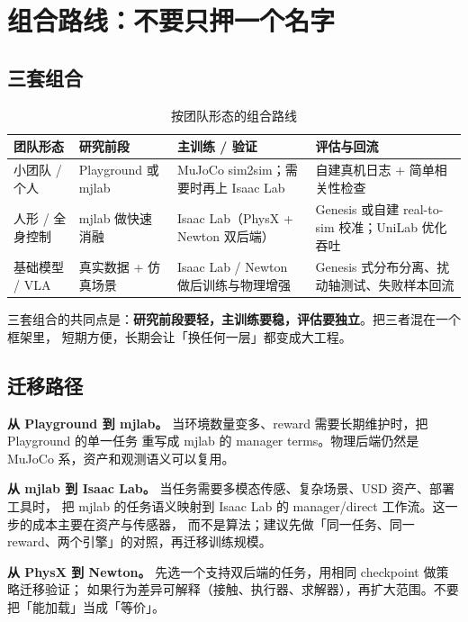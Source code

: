 \documentclass[UTF8, 11pt, a4paper, fontset=windows]{ctexart}
\begin{document}
\section{组合路线：不要只押一个名字}\label{sec:recipes}

\subsection{三套组合}

\begin{table}[htbp]
\centering
\caption{按团队形态的组合路线}
\label{tab:recipes}
\small
\begin{tabularx}{\linewidth}{@{}L{2.35cm}L{3.4cm}L{3.8cm}Y@{}}
\toprule
\textbf{团队形态} & \textbf{研究前段} & \textbf{主训练 / 验证} & \textbf{评估与回流} \\
\midrule
小团队 / 个人 & Playground 或 mjlab & MuJoCo sim2sim；需要时再上 Isaac Lab & 自建真机日志 + 简单相关性检查 \\
人形 / 全身控制 & mjlab 做快速消融 & Isaac Lab（PhysX + Newton 双后端） & Genesis 或自建 real-to-sim 校准；UniLab 优化吞吐 \\
基础模型 / VLA & 真实数据 + 仿真场景 & Isaac Lab / Newton 做后训练与物理增强 & Genesis 式分布分离、扰动轴测试、失败样本回流 \\
\bottomrule
\end{tabularx}
\end{table}

三套组合的共同点是：\textbf{研究前段要轻，主训练要稳，评估要独立}。把三者混在一个框架里，
短期方便，长期会让「换任何一层」都变成大工程。

\subsection{迁移路径}

\textbf{从 Playground 到 mjlab。} 当环境数量变多、reward 需要长期维护时，把 Playground 的单一任务
重写成 mjlab 的 manager terms。物理后端仍然是 MuJoCo 系，资产和观测语义可以复用。

\textbf{从 mjlab 到 Isaac Lab。} 当任务需要多模态传感、复杂场景、USD 资产、部署工具时，
把 mjlab 的任务语义映射到 Isaac Lab 的 manager/direct 工作流。这一步的成本主要在资产与传感器，
而不是算法；建议先做「同一任务、同一 reward、两个引擎」的对照，再迁移训练规模。

\textbf{从 PhysX 到 Newton。} 先选一个支持双后端的任务，用相同 checkpoint 做策略迁移验证；
如果行为差异可解释（接触、执行器、求解器），再扩大范围。不要把「能加载」当成「等价」。
\end{document}
